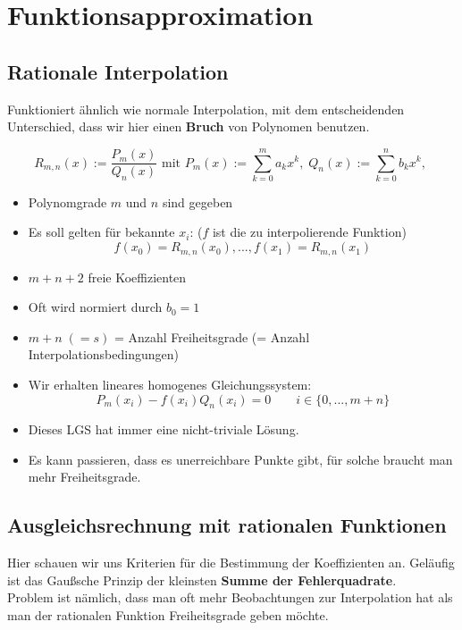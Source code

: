 \documentclass[a4paper]{article}
\begin{document}
\section{Funktionsapproximation}

\subsection{Rationale Interpolation}

Funktioniert ähnlich wie normale Interpolation, mit dem entscheidenden
Unterschied, dass wir hier einen \textbf{Bruch} von Polynomen benutzen.

\[
	R_{m, n} (x) := \frac{ 
		P_m (x)
	}{ Q_n (x) } \text{ mit }
	P_m (x) := \sum_{k=0}^{m} a_k x^{k}, \;
	Q_n (x) := \sum_{k=0}^{n} b_k x^{k}, \;
\] 

\begin{itemize}
	\item Polynomgrade $m$ und $n$ sind gegeben
	\item Es soll gelten für bekannte $x_i$: ($f$ ist die zu 
		interpolierende Funktion)
		\[
			f(x_0) = R_{m, n} (x_0), ...,
			f(x_1) = R_{m, n} (x_1)
		\] 
	\item $m+n+2$ freie Koeffizienten
	\item Oft wird normiert durch $b_0 = 1$
	\item $m+n \; (=s)$ = Anzahl Freiheitsgrade (= Anzahl Interpolationsbedingungen)
	\item Wir erhalten lineares homogenes Gleichungssystem:
		\[
			P_m (x_i) - f(x_i) Q_n(x_i) = 0
			\qquad i \in \{
				0, ..., m+n
			\} 
		\] 
	\item Dieses LGS hat immer eine nicht-triviale Lösung.
	\item Es kann passieren, dass es unerreichbare Punkte gibt, für solche
		braucht man mehr Freiheitsgrade.
\end{itemize}

\subsection{Ausgleichsrechnung mit rationalen Funktionen}

Hier schauen wir uns Kriterien für die Bestimmung der Koeffizienten an.
Geläufig ist das Gaußsche Prinzip der kleinsten 
\textbf{Summe der Fehlerquadrate}.
\\

Problem ist nämlich, dass man oft mehr Beobachtungen zur Interpolation
hat als man der rationalen Funktion Freiheitsgrade geben möchte.
\\
\end{document}
